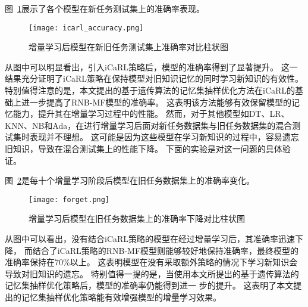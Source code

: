 图~\ref{fig:acc_icarl}展示了各个模型在新任务测试集上的准确率表现。
\begin{figure}[h]
  \centering
  \texttt{[image: icarl\_accuracy.png]}
  \caption{增量学习后模型在新旧任务测试集上准确率对比柱状图}
  \label{fig:acc_icarl}
\end{figure}
从图中可以明显看出，引入iCaRL策略后，模型的准确率得到了显著提升。
这一结果充分证明了iCaRL策略在保持模型对旧知识记忆的同时学习新知识的有效性。
特别值得注意的是，本文提出的基于遗传算法的记忆集抽样优化方法在iCaRL的基础上进一步提高了RNB-MF模型的准确率。
这表明该方法能够有效保留模型的记忆能力，提升其在增量学习过程中的性能。
然而，对于其他模型如DT、LR、KNN、NB和Ada，在进行增量学习后面对新任务数据集与旧任务数据集的混合测试集时表现并不理想。
这可能是因为这些模型在学习新知识的过程中，容易遗忘旧知识，导致在混合测试集上的性能下降。
下面的实验是对这一问题的具体验证。   

图~\ref{fig:acc_forget}是每十个增量学习阶段后模型在旧任务数据集上的准确率变化。
\begin{figure}[h]
  \centering
  \texttt{[image: forget.png]}
  \caption{增量学习后模型在旧任务数据集上的准确率下降对比柱状图}
  \label{fig:acc_forget}
\end{figure}
\par
从图中可以看出，没有结合iCaRL策略的模型在经过增量学习后，其准确率迅速下降，
而结合了iCaRL策略的RNB-MF模型则能够较好地保持准确率，最终模型的准确率保持在70\%以上。
这表明模型在没有采取额外策略的情况下学习新知识会导致对旧知识的遗忘。
特别值得一提的是，当使用本文所提出的基于遗传算法的记忆集抽样优化策略后，模型的准确率仍能得到进一 步的提升。
这表明了本文提出的记忆集抽样优化策略能有效增强模型的增量学习效果。

